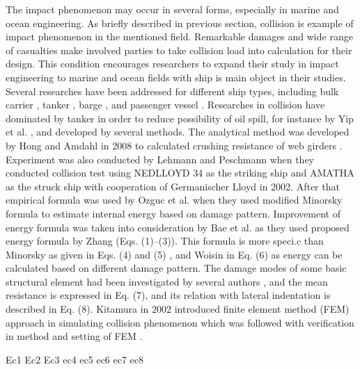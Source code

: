 \documentclass[10pt,journal]{IEEEtran}
\begin{document}
The impact phenomenon may occur in several forms, espe­cially in marine and ocean engineering. As briefly described in previous section, collision is example of impact phenomenon in the mentioned field. 
Remarkable damages and wide range of casualties make involved parties to take collision load into calculation for their design. 
This condition encourages researchers to expand their study in impact engineering to marine and ocean fields with ship is main object in their studies. 
Several researches have been addressed for different ship types, including bulk carrier \cite{ozguc2005comparative}, tanker \cite{haris2013analysis,bae2016numerical}, barge \cite{leheta2014finite}, and passenger vessel \cite{prabowo2016evaluating,prabowo2016energy,prabowo2017analysis,prabowo2017effects}. 
Researches in collision have dominated by tanker in order to reduce possibility of oil spill, for instance by Yip et al. \cite{yip2011effectiveness}, and developed by several methods. 
The analytical method was developed by Hong and Amdahl in 2008 to calcu­lated crushing resistance of web girders \cite{hong2008crushing}. Experiment was also conducted by Lehmann and Peschmann \cite{lehmann2002energy} 
when they conducted collision test using NEDLLOYD 34 as the striking ship and AMATHA as the struck ship with cooperation of Germanischer Lloyd in 2002. After that empirical formula was used by Ozguc et al. \cite{ozguc2005comparative} 
when they used modified Minorsky formula to estimate internal energy based on damage pattern. Improvement of energy formula was taken into consideration by Bae et al. \cite{bae2016study}
as they used proposed energy formula by Zhang (Eqs. (1)–(3)). This formula is more speci.c than Minorsky as given in Eqs. (4) and (5) \cite{minorsky1958analysis}, and Woisin in Eq. (6) \cite{woisin1979design} as energy can be calculated based on different damage pattern. 
The damage modes of some basic structural element had been investigated by several authors \cite{paik1995ultimate,lu1990cutting,wierzbicki1993closed,simonsen1997ship,prabowo2017structural}, and the mean resistance is expressed in Eq. (7), and its relation with lateral indentation is described in Eq. (8). Kitamura 
in 2002 introduced finite element method (FEM) approach in simulating collision phenomenon \cite{kitamura2002fem} which was followed with verification in method and setting of FEM \cite{wisniewski2003effect}. 

Ec1
Ec2
Ec3
ec4
ec5
ec6
ec7
ec8
 
\end{document}
